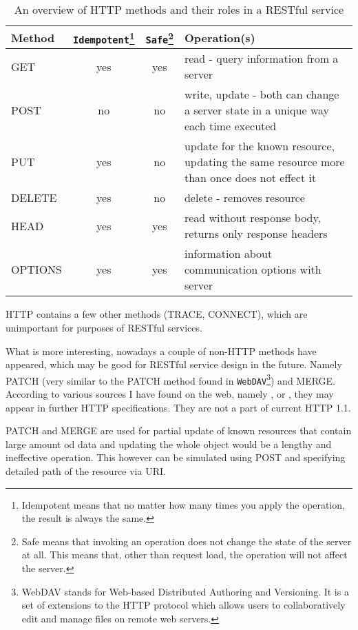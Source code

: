 	\begin{table}[h]\centering
	 	\begin{minipage}{12.9cm}
		\begin{tabular}{l|c|c|p{6cm}}
		\hline
		Method & \verb|Idempotent|\footnote{Idempotent means that no matter how many times you apply the operation, 
		the result is always the same.} & \verb|Safe|\footnote{Safe means that invoking an operation does not change the 
		state of the server at all. This means that, other than request load, the operation will not affect the server.} 
		& Operation(s)\\
		\hline
		GET & yes & yes & read - query information from a server\\
		POST & no & no & write, update - both can change a server state in a unique way each time executed\\
		PUT & yes & no & update for the known resource, updating the same resource more than once does not effect it\\
		DELETE & yes & no & delete - removes resource\\
		HEAD & yes & yes & read without response body, returns only response headers\\
		OPTIONS & yes & yes & information about communication options with server\\
		\end{tabular}
	    \renewcommand{\footnoterule}{}
	    \end{minipage}
	\caption{An overview of HTTP methods and their roles in a RESTful service}
	\label{http_methods}
	\end{table}
	
	HTTP contains a few other methods (TRACE, CONNECT), which are unimportant for purposes of RESTful services.
	
	What is more interesting, nowadays a couple of non-HTTP methods have appeared, which may be good for RESTful service
	design in the future. Namely PATCH (very similar to the PATCH method found in \verb|WebDAV|\footnote{WebDAV stands for
	Web-based Distributed Authoring and Versioning. It is a set of extensions to the HTTP protocol which allows users to 
	collaboratively edit and manage files on remote web servers.}) and MERGE. According to various sources I have found on
	the web, namely \cite{httppatch}, \cite{msdnpatchmerge} or \cite{rfc2616}, they may appear in further HTTP
	specifications. They are not a part of current HTTP 1.1.
	
	PATCH and MERGE are used for partial update of known resources that contain large amount od data and updating the whole
	object would be a lengthy and ineffective operation. This however can be simulated using POST and specifying detailed
	path of the resource via URI.
	
